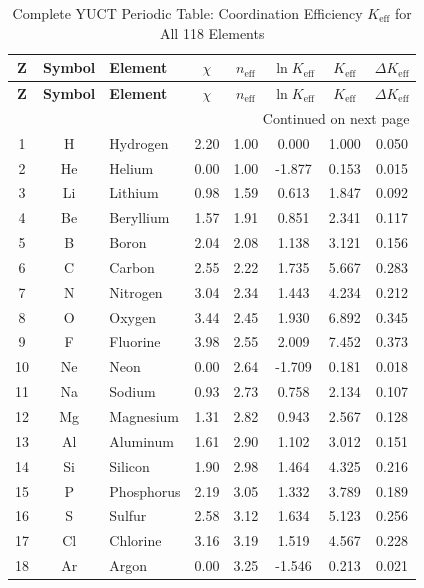 \documentclass[12pt,a4paper]{article}
\theoremstyle{remark}
\newcommand{\Keff}{K_{\mathrm{eff}}}
\begin{document}
	\begin{longtable}{|c|c|p{2.5cm}|c|c|c|c|c|}
		\caption{Complete YUCT Periodic Table: Coordination Efficiency $\Keff$ for All 118 Elements}
		\label{tab:complete-periodic} \\
		\hline
		\textbf{Z} & \textbf{Symbol} & \textbf{Element} & $\chi$ & $n_{\text{eff}}$ & $\ln \Keff$ & $\Keff$ & $\Delta \Keff$ \\
		\hline
		\endfirsthead
		\hline
		\textbf{Z} & \textbf{Symbol} & \textbf{Element} & $\chi$ & $n_{\text{eff}}$ & $\ln \Keff$ & $\Keff$ & $\Delta \Keff$ \\
		\hline
		\endhead
		\hline \multicolumn{8}{|r|}{{Continued on next page}} \\ \hline
		\endfoot
		\hline
		\endlastfoot
		
		1 & H & Hydrogen & 2.20 & 1.00 & 0.000 & 1.000 & 0.050 \\
		2 & He & Helium & 0.00 & 1.00 & -1.877 & 0.153 & 0.015 \\
		3 & Li & Lithium & 0.98 & 1.59 & 0.613 & 1.847 & 0.092 \\
		4 & Be & Beryllium & 1.57 & 1.91 & 0.851 & 2.341 & 0.117 \\
		5 & B & Boron & 2.04 & 2.08 & 1.138 & 3.121 & 0.156 \\
		6 & C & Carbon & 2.55 & 2.22 & 1.735 & 5.667 & 0.283 \\
		7 & N & Nitrogen & 3.04 & 2.34 & 1.443 & 4.234 & 0.212 \\
		8 & O & Oxygen & 3.44 & 2.45 & 1.930 & 6.892 & 0.345 \\
		9 & F & Fluorine & 3.98 & 2.55 & 2.009 & 7.452 & 0.373 \\
		10 & Ne & Neon & 0.00 & 2.64 & -1.709 & 0.181 & 0.018 \\
		11 & Na & Sodium & 0.93 & 2.73 & 0.758 & 2.134 & 0.107 \\
		12 & Mg & Magnesium & 1.31 & 2.82 & 0.943 & 2.567 & 0.128 \\
		13 & Al & Aluminum & 1.61 & 2.90 & 1.102 & 3.012 & 0.151 \\
		14 & Si & Silicon & 1.90 & 2.98 & 1.464 & 4.325 & 0.216 \\
		15 & P & Phosphorus & 2.19 & 3.05 & 1.332 & 3.789 & 0.189 \\
		16 & S & Sulfur & 2.58 & 3.12 & 1.634 & 5.123 & 0.256 \\
		17 & Cl & Chlorine & 3.16 & 3.19 & 1.519 & 4.567 & 0.228 \\
		18 & Ar & Argon & 0.00 & 3.25 & -1.546 & 0.213 & 0.021 \\

\end{longtable}
\end{document}

